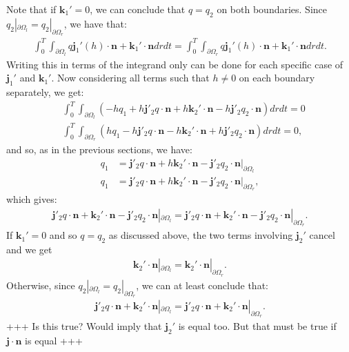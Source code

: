\documentclass[11pt, a4paper]{article}
\theoremstyle{definition}
\newcommand{\n}{\mathbf{n}}
\newcommand{\jf}{\mathbf j}
\begin{document}
	Note that if $\mathbf{k}_1' = 0$, we can conclude that $q = q_2$ on both boundaries.
	Since $q_2|_{\partial \Omega_l} = q_2|_{\partial \Omega_r}$, we have that:
	\begin{align*}
		\int_0^T \int_{\partial \Omega_l}  q \jf_1'(h)   \cdot \n  +\mathbf{k}_1' \cdot \n   dr dt = \int_0^T \int_{\partial \Omega_r} q \jf_1'(h)   \cdot \n  +  \mathbf{k}_1' \cdot \n  dr dt .
	\end{align*}
	Writing this in terms of the integrand only can be done for each specific case of $\jf_1'$ and $\mathbf{k}_1'$. 
	 Now considering all terms such that $h \neq 0$ on each boundary separately, we get:
	 \begin{align*}
	 	&\int_0^T \int_{\partial \Omega_l} \left(- h q_1  + h \jf'_2 q \cdot \n + h\mathbf{k}_2' \cdot \n-  h \jf'_2 q_2 \cdot \n \right)   dr  dt =0 \\
	 	&\int_0^T \int_{\partial \Omega_r} \left( h q_1  - h \jf'_2 q \cdot \n - h\mathbf{k}_2' \cdot \n + h \jf'_2 q_2 \cdot \n \right)   dr  dt =0 ,
	 \end{align*}
 	and so, as in the previous sections, we have:
 	\begin{align*}
 		q_1 &=   \jf'_2 q \cdot \n + h\mathbf{k}_2' \cdot \n - \jf'_2 q_2 \cdot \n |_{\partial \Omega_l} \\
		q_1 &=  \jf'_2 q \cdot \n + h\mathbf{k}_2' \cdot \n -\jf'_2 q_2 \cdot \n |_{\partial \Omega_r}, 
 	\end{align*}
	which gives:
	\begin{align*}
		  \jf'_2 q \cdot \n +  \mathbf{k}_2' \cdot \n - \jf'_2 q_2 \cdot \n |_{\partial \Omega_l} =  \jf'_2 q \cdot \n + \mathbf{k}_2' \cdot \n - \jf'_2 q_2 \cdot \n |_{\partial \Omega_r}.
	\end{align*}
	If $\mathbf{k}_1' = 0$ and so $q = q_2$ as discussed above, the two terms involving $\jf_2'$ cancel and we get
	\begin{align*}
	 \mathbf{k}_2' \cdot \n  |_{\partial \Omega_l} =   \mathbf{k}_2' \cdot \n  |_{\partial \Omega_r}.
	\end{align*}
	Otherwise, since $q_2|_{\partial \Omega_l} = q_2|_{\partial \Omega_r}$, we can at least conclude that:
	\begin{align*}
		\jf'_2 q \cdot \n + \mathbf{k}_2' \cdot \n  |_{\partial \Omega_l} =  \jf'_2 q \cdot \n + \mathbf{k}_2' \cdot \n  |_{\partial \Omega_r}.
	\end{align*}
+++ Is this true? Would imply that $ \jf_2'$ is equal too. But that must be true if $\jf \cdot \n$ is equal +++
\end{document}
